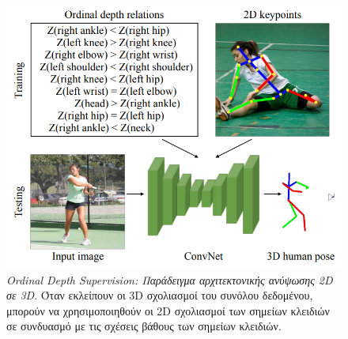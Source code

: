  \begin{figure}[h]
    \centering
    \includegraphics[scale=0.5]{images/chapter2/3d_pose_estimation/ordinal_depth_architecture.png}
    \caption[Ordinal Depth Supervision: Παράδειγμα αρχιτεκτονικής ανύψωσης 2D σε 3D]{\textsl{Ordinal Depth Supervision: Παράδειγμα αρχιτεκτονικής ανύψωσης 2D σε 3D}. Όταν εκλείπουν οι 3D σχολιασμοί του συνόλου δεδομένου, μπορούν να χρησιμοποιηθούν οι 2D σχολιασμοί των σημείων κλειδιών σε συνδυασμό με τις σχέσεις βάθους των σημείων κλειδιών.}
    \label{fig:ordinal_depth_architecture}
\end{figure}
